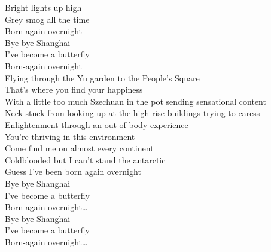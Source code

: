 Bright lights up high \\
Grey smog all the time \\
Born-again overnight \\
Bye bye Shanghai \\
I've become a butterfly \\
Born-again overnight \\

Flying through the Yu garden to the People's Square \\
That's where you find your happiness \\
With a little too much Szechuan in the pot sending sensational content \\
Neck stuck from looking up at the high rise buildings trying to caress \\
Enlightenment through an out of body experience \\
You're thriving in this environment \\
Come find me on almost every continent \\
Coldblooded but I can't stand the antarctic \\
Guess I've been born again overnight \\

Bye bye Shanghai \\
I've become a butterfly \\
Born-again overnight… \\
Bye bye Shanghai \\
I've become a butterfly \\
Born-again overnight… \\




